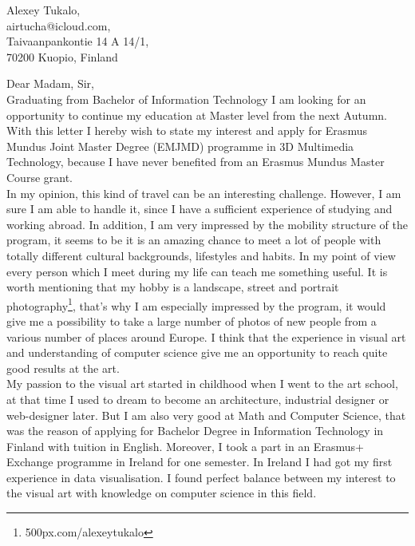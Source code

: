 \documentclass[english]{article}
\date{}
\begin{document}
\begin{flushright}
Alexey Tukalo,\\
airtucha@icloud.com,\\
Taivaanpankontie 14 A 14/1,\\
70200 Kuopio, Finland
\end{flushright}

Dear Madam, Sir,\\ 

Graduating from Bachelor of Information Technology I am looking for an opportunity to continue my education at Master level from the next Autumn. With this letter I hereby wish to state my interest and apply for Erasmus Mundus Joint Master Degree (EMJMD) programme in 3D Multimedia Technology, because I have never benefited from an Erasmus Mundus Master Course grant.\\

In my opinion, this kind of travel can be an interesting challenge. However, I am sure I am able to handle it, since I have a sufficient experience of studying and working abroad. In addition, I am very impressed by the mobility structure of the program, it seems to be it is an amazing chance to meet a lot of people with totally different cultural backgrounds, lifestyles and habits. In my point of view every person which I meet during my life can teach me something useful. It is worth mentioning that my hobby is a landscape, street and portrait photography\footnote{500px.com/alexeytukalo}, that’s why I am especially impressed by the program, it would give me a possibility to take a large number of photos of new people from a various number of places around Europe. I think that the experience in visual art and understanding of computer science give me an opportunity to reach quite good results at the art.\\

My passion to the visual art started in childhood when I went to the art school, at that time I used to dream to become an architecture, industrial designer or web-designer later. But I am also very good at Math and Computer Science, that was the reason of applying for Bachelor Degree in Information Technology in Finland with tuition in English. Moreover, I took a part in an Erasmus+ Exchange programme in Ireland for one semester. In Ireland I had got my first experience in data visualisation. I found perfect balance between my interest to the visual art with knowledge on computer science in this field.\\
\end{document}
